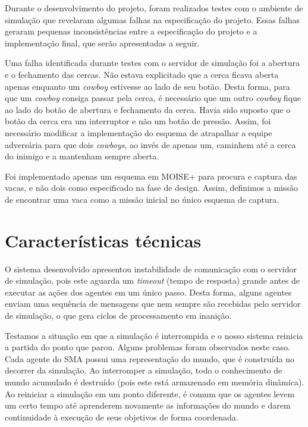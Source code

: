 \documentclass{llncs}
\begin{document}
Durante o desenvolvimento do projeto, foram realizados testes com o ambiente de simulação que revelaram algumas falhas na especificação do projeto. Essas falhas geraram pequenas inconsistências entre a especificação do projeto e a implementação final, que serão apresentadas a seguir.

Uma falha identificada durante testes com o servidor de simulação foi a abertura e o fechamento das cercas. Não estava explicitado que a cerca ficava aberta apenas enquanto um \textit{cowboy} estivesse ao lado de seu botão. Desta forma, para que um \textit{cowboy} consiga passar pela cerca, é necessário que um outro \textit{cowboy} fique ao lado do botão de abertura e fechamento da cerca. Havia sido suposto que o botão da cerca era um interruptor e não um botão de pressão. Assim, foi necessário modificar a implementação do esquema de atrapalhar a equipe adversária para que dois \textit{cowboys}, ao invés de apenas um, caminhem até a cerca do inimigo e a mantenham sempre aberta.

Foi implementado apenas um esquema em MOISE+ para procura e captura das vacas, e não dois como especificado na fase de design. Assim, definimos a missão de encontrar uma vaca como a missão inicial no único esquema de captura.



\section{Características técnicas}


O sistema desenvolvido apresentou instabilidade de comunicação com o servidor de simulação, pois este aguarda um \textit{timeout} (tempo de resposta) grande antes de executar as ações dos agentes em um único passo. Desta forma, alguns agentes enviam uma sequência de mensagens que nem sempre são recebidas pelo servidor de simulação, o que gera ciclos de processamento em inanição.

Testamos a situação em que a simulação é interrompida e o nosso sistema reinicia a partida do ponto que parou. Alguns problemas foram observados neste caso. Cada agente do SMA possui uma representação do mundo, que é construída no decorrer da simulação. Ao interromper a simulação, todo o conhecimento de mundo acumulado é destruído (pois este está armazenado em memória dinâmica). Ao reiniciar a simulação em um ponto diferente, é comum que os agentes levem um certo tempo até aprenderem novamente as informações do mundo e darem continuidade à execução de seus objetivos de forma coordenada.
\end{document}
